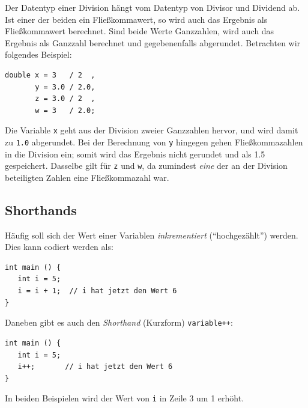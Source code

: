 {{{{\begin{hintbox}
Der Datentyp einer Division hängt vom Datentyp von Divisor und Dividend ab. Ist einer der beiden ein Fließkommawert, so wird auch das Ergebnis als Fließkommawert berechnet. Sind beide Werte Ganzzahlen, wird auch das Ergebnis als Ganzzahl berechnet und gegebenenfalls abgerundet. Betrachten wir folgendes Beispiel:
\begin{codebox}
\begin{verbatim}
double x = 3   / 2  ,
       y = 3.0 / 2.0,
       z = 3.0 / 2  ,
       w = 3   / 2.0;
\end{verbatim}
\end{codebox}
Die Variable \texttt{x} geht aus der Division zweier Ganzzahlen hervor, und wird damit zu \texttt{1.0} abgerundet. Bei der Berechnung von \texttt{y} hingegen gehen Fließkommazahlen in die Division ein; somit wird das Ergebnis nicht gerundet und als 1.5 gespeichert. Dasselbe gilt für \texttt{z} und \texttt{w}, da zumindest \emph{eine} der an der Division beteiligten Zahlen eine Fließkommazahl war.
\end{hintbox}

\subsection{Shorthands}
Häufig soll sich der Wert einer Variablen \emph{inkrementiert} (\enquote{hochgezählt}) werden. Dies kann codiert werden als:
\begin{codebox}
\begin{verbatim}
int main () {
   int i = 5;
   i = i + 1;  // i hat jetzt den Wert 6
}
\end{verbatim}
\end{codebox}

Daneben gibt es auch den \emph{Shorthand} (Kurzform) \texttt{variable++}:
\begin{codebox}
\begin{verbatim}
int main () {
   int i = 5;
   i++;       // i hat jetzt den Wert 6
}
\end{verbatim}
\end{codebox}

In beiden Beispielen wird der Wert von \texttt{i} in Zeile 3 um 1 erhöht.

}}}}
